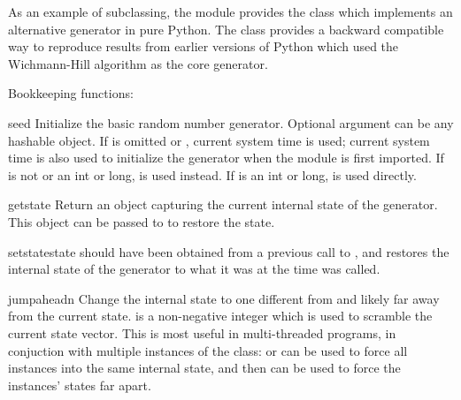 As an example of subclassing, the  module provides
the  class which implements an alternative generator
in pure Python.  The class provides a backward compatible way to
reproduce results from earlier versions of Python which used the
Wichmann-Hill algorithm as the core generator.


Bookkeeping functions:

\begin{funcdesc}{seed}{}
  Initialize the basic random number generator.
  Optional argument  can be any hashable object.
  If  is omitted or , current system time is used;
  current system time is also used to initialize the generator when the
  module is first imported.
  If  is not  or an int or long,
   is used instead.
  If  is an int or long,  is used directly.
\end{funcdesc}

\begin{funcdesc}{getstate}{}
  Return an object capturing the current internal state of the
  generator.  This object can be passed to  to
  restore the state.
\end{funcdesc}

\begin{funcdesc}{setstate}{state}
   should have been obtained from a previous call to
  , and  restores the
  internal state of the generator to what it was at the time
   was called.
\end{funcdesc}

\begin{funcdesc}{jumpahead}{n}
  Change the internal state to one different from and likely far away from
  the current state.   is a non-negative integer which is used to
  scramble the current state vector.  This is most useful in multi-threaded
  programs, in conjuction with multiple instances of the 
  class:  or  can be used to force all
  instances into the same internal state, and then 
  can be used to force the instances' states far apart.
 \end{funcdesc}

